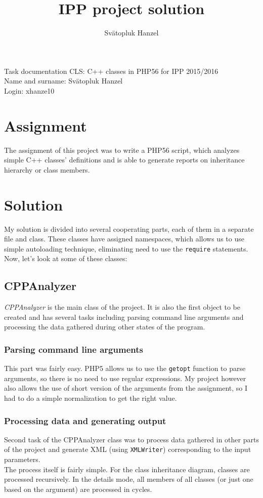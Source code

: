 \documentclass[10pt,a4paper]{article}[14.03.2017]
\author{Svätopluk Hanzel}
\title{IPP project solution}
\begin{document}
    \noindent Task documentation CLS: C++ classes in PHP56 for IPP 2015/2016\\
	Name and surname: Svätopluk Hanzel\\
	Login: xhanze10\\
	
	\section{Assignment}
		The assignment of this project was to write a PHP56 script, which analyzes simple C++ classes' definitions and is able to generate reports on inheritance hierarchy or class members.\\
	
	\section{Solution}
		My solution is divided into several cooperating parts, each of them in a separate file and class. These classes have assigned namespaces, which allows us to use simple autoloading technique, eliminating need to use the \texttt{require} statements.\\
		Now, let's look at some of these classes:
		\subsection{CPPAnalyzer}
		\emph{CPPAnalyzer} is the main class of the project. It is also the first object to be created and has several tasks including parsing command line arguments and processing the data gathered during other states of the program.
			\subsubsection{Parsing command line arguments}
			This part was fairly easy. PHP5 allows us to use the \texttt{getopt} function to parse arguments, so there is no need to use regular expressions. My project however also allows the use of short version of the arguments from the assignment, so I had to do a simple normalization to get the right value.
			\subsubsection{Processing data and generating output}
			Second task of the CPPAnalyzer class was to process data gathered in other parts of the project and generate XML (using \texttt{XMLWriter}) corresponding to the input parameters.\\
			The process itself is fairly simple. For the class inheritance diagram, classes are processed recursively. In the details mode, all members of all classes (or just one based on the argument) are processed in cycles.
			
\end{document}
